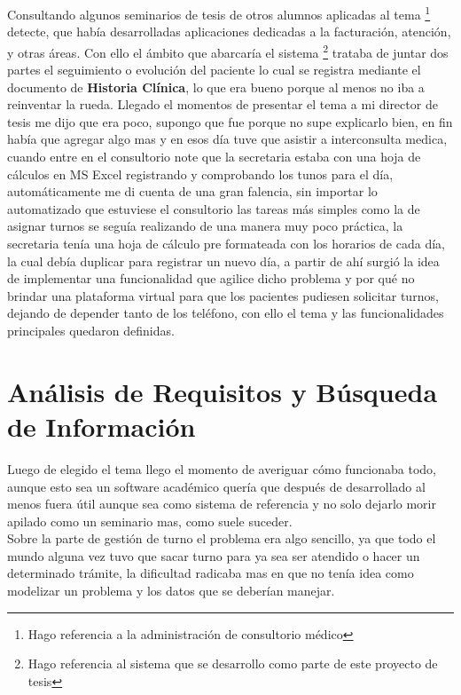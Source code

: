 Consultando algunos seminarios de tesis de otros alumnos aplicadas al tema \footnote{Hago referencia a la administración de consultorio médico} detecte, que había desarrolladas aplicaciones dedicadas a la facturación, atención, y otras áreas. Con ello el ámbito que abarcaría el sistema \footnote{Hago referencia al sistema que se desarrollo como parte de este proyecto de tesis} trataba de juntar dos partes el seguimiento o evolución del paciente lo cual se registra mediante el documento de \textbf{Historia Clínica}, lo que era bueno porque al menos no iba a reinventar la rueda. Llegado el momentos de presentar el tema a mi director de tesis me dijo que era poco, supongo que fue porque no supe explicarlo bien, en fin había que agregar algo  mas y en esos día tuve que asistir a interconsulta medica, cuando entre en el consultorio note que la secretaria estaba con una hoja de cálculos en MS Excel registrando y comprobando los tunos para el día, automáticamente me di cuenta de una gran falencia, sin importar lo automatizado que estuviese el consultorio las tareas más simples como la de asignar turnos se seguía realizando de una manera muy poco práctica, la secretaria tenía una hoja de cálculo pre formateada con los horarios de cada día, la cual debía duplicar para registrar un nuevo día, a partir de ahí surgió la idea de implementar una funcionalidad que agilice dicho  problema y por qué no brindar una plataforma virtual para que los pacientes pudiesen solicitar turnos, dejando de depender tanto de los teléfono, con ello el tema y las funcionalidades principales quedaron definidas. 


\section{Análisis de Requisitos y Búsqueda de Información}

Luego de elegido el tema llego el momento de averiguar cómo funcionaba todo, aunque esto sea un software académico quería que después de desarrollado al menos fuera útil aunque sea como sistema de referencia y no solo dejarlo morir apilado como un seminario mas, como suele suceder. \\[0.1cm]

Sobre la parte de gestión de turno el problema era algo sencillo, ya que todo el mundo alguna vez tuvo que sacar turno para ya sea ser atendido o hacer un determinado trámite, la dificultad radicaba mas en que no tenía idea como modelizar un problema y los datos que se deberían manejar. \\[0.1cm]

